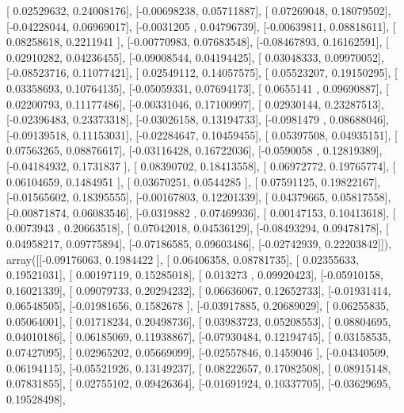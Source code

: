 \documentclass{article}
\begin{document}
       [ 0.02529632,  0.24008176],
       [-0.00698238,  0.05711887],
       [ 0.07269048,  0.18079502],
       [-0.04228044,  0.06969017],
       [-0.0031205 ,  0.04796739],
       [-0.00639811,  0.08818611],
       [ 0.08258618,  0.2211941 ],
       [-0.00770983,  0.07683548],
       [-0.08467893,  0.16162591],
       [ 0.02910282,  0.04236455],
       [-0.09008544,  0.04194425],
       [ 0.03048333,  0.09970052],
       [-0.08523716,  0.11077421],
       [ 0.02549112,  0.14057575],
       [ 0.05523207,  0.19150295],
       [ 0.03358693,  0.10764135],
       [-0.05059331,  0.07694173],
       [ 0.0655141 ,  0.09690887],
       [ 0.02200793,  0.11177486],
       [-0.00331046,  0.17100997],
       [ 0.02930144,  0.23287513],
       [-0.02396483,  0.23373318],
       [-0.03026158,  0.13194733],
       [-0.0981479 ,  0.08688046],
       [-0.09139518,  0.11153031],
       [-0.02284647,  0.10459455],
       [ 0.05397508,  0.04935151],
       [ 0.07563265,  0.08876617],
       [-0.03116428,  0.16722036],
       [-0.0590058 ,  0.12819389],
       [-0.04184932,  0.1731837 ],
       [ 0.08390702,  0.18413558],
       [ 0.06972772,  0.19765774],
       [ 0.06104659,  0.1484951 ],
       [ 0.03670251,  0.0544285 ],
       [ 0.07591125,  0.19822167],
       [-0.01565602,  0.18395555],
       [-0.00167803,  0.12201339],
       [ 0.04379665,  0.05817558],
       [-0.00871874,  0.06083546],
       [-0.0319882 ,  0.07469936],
       [ 0.00147153,  0.10413618],
       [ 0.0073943 ,  0.20663518],
       [ 0.07042018,  0.04536129],
       [-0.08493294,  0.09478178],
       [ 0.04958217,  0.09775894],
       [-0.07186585,  0.09603486],
       [-0.02742939,  0.22203842]]), array([[-0.09176063,  0.1984422 ],
       [ 0.06406358,  0.08781735],
       [ 0.02355633,  0.19521031],
       [ 0.00197119,  0.15285018],
       [ 0.013273  ,  0.09920423],
       [-0.05910158,  0.16021339],
       [ 0.09079733,  0.20294232],
       [ 0.06636067,  0.12652733],
       [-0.01931414,  0.06548505],
       [-0.01981656,  0.1582678 ],
       [-0.03917885,  0.20689029],
       [ 0.06255835,  0.05064001],
       [ 0.01718234,  0.20498736],
       [ 0.03983723,  0.05208553],
       [ 0.08804695,  0.04010186],
       [ 0.06185069,  0.11938867],
       [-0.07930484,  0.12194745],
       [ 0.03158535,  0.07427095],
       [ 0.02965202,  0.05669099],
       [-0.02557846,  0.1459046 ],
       [-0.04340509,  0.06194115],
       [-0.05521926,  0.13149237],
       [ 0.08222657,  0.17082508],
       [ 0.08915148,  0.07831855],
       [ 0.02755102,  0.09426364],
       [-0.01691924,  0.10337705],
       [-0.03629695,  0.19528498],
\end{document}
